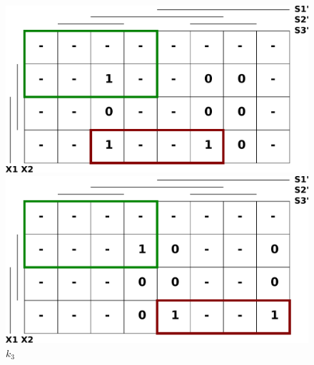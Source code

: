 \documentclass[titlepage]{article}
\begin{document}
\begin{center}
\begin{figure}[ht!]
\begin{minipage}[b]{0.45\linewidth}
\includegraphics[width=\textwidth]{karnaugh_j3.pdf}
	\caption{$j_3$}
\end{minipage}
\begin{minipage}[b]{0.45\linewidth}
\includegraphics[width=\textwidth]{karnaugh_k3.pdf}
	\caption{$k_3$}
\end{minipage}
\end{figure}


\end{center}
\end{document}
